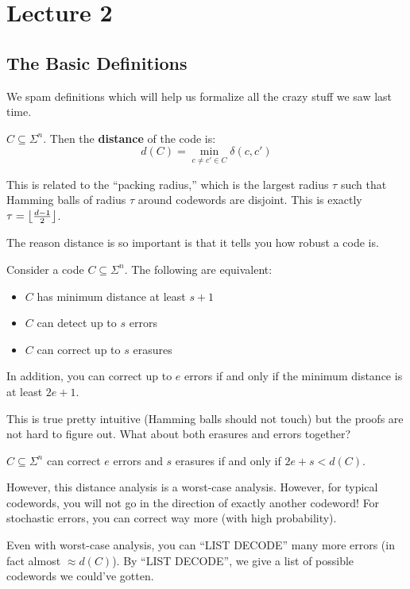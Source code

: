 \section{Lecture 2}

\subsection{The Basic Definitions}
We spam definitions which will help us formalize all the crazy stuff we saw last time.
\begin{definition}
    $C \subseteq \Sigma^n$. Then the \textbf{distance} of the code is:
    \[ d(C) = \min_{c \neq c' \in C} \delta(c, c') \]
\end{definition}
This is related to the ``packing radius,'' which is the largest radius $\tau$ such that
Hamming balls of radius $\tau$ around codewords are disjoint. This is exactly $\tau = \left\lfloor \frac{d - 1}{2} \right\rfloor$.

The reason distance is so important is that it tells you how robust a code is.
\begin{theorem}
    Consider a code $C \subseteq \Sigma^n$. The following are equivalent:
    \begin{itemize}
        \item $C$ has minimum distance at least $s + 1$
        \item $C$ can detect up to $s$ errors
        \item $C$ can correct up to $s$ erasures
    \end{itemize}

    In addition, you can correct up to $e$ errors if and only if the minimum distance is at least $2e + 1$.
\end{theorem}
This is true pretty intuitive (Hamming balls should not touch) but the proofs are not hard to figure out. What
about both erasures and errors together?
\begin{theorem} 
    $C \subseteq \Sigma^n$ can correct $e$ errors and $s$ erasures if and only if $2e + s < d(C)$.
\end{theorem}
However, this distance analysis is a worst-case analysis. However, for typical codewords, you will not go in the direction of exactly another codeword!
For stochastic errors, you can correct way more (with high probability).

Even with worst-case analysis, you can ``LIST DECODE'' many more errors (in fact almost $\approx d(C)$). By ``LIST DECODE'', we give a list of possible codewords we could've gotten.


